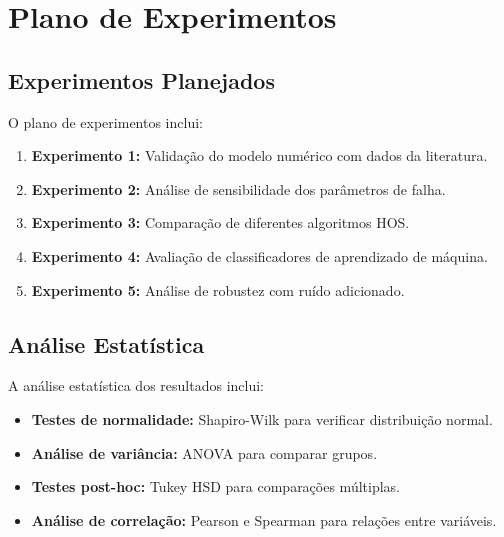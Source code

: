 \section{Plano de Experimentos}

\subsection{Experimentos Planejados}

O plano de experimentos inclui:

\begin{enumerate}
    \item \textbf{Experimento 1:} Validação do modelo numérico com dados da literatura.
    \item \textbf{Experimento 2:} Análise de sensibilidade dos parâmetros de falha.
    \item \textbf{Experimento 3:} Comparação de diferentes algoritmos HOS.
    \item \textbf{Experimento 4:} Avaliação de classificadores de aprendizado de máquina.
    \item \textbf{Experimento 5:} Análise de robustez com ruído adicionado.
\end{enumerate}

\subsection{Análise Estatística}

A análise estatística dos resultados inclui:

\begin{itemize}
    \item \textbf{Testes de normalidade:} Shapiro-Wilk para verificar distribuição normal.
    \item \textbf{Análise de variância:} ANOVA para comparar grupos.
    \item \textbf{Testes post-hoc:} Tukey HSD para comparações múltiplas.
    \item \textbf{Análise de correlação:} Pearson e Spearman para relações entre variáveis.
\end{itemize}
